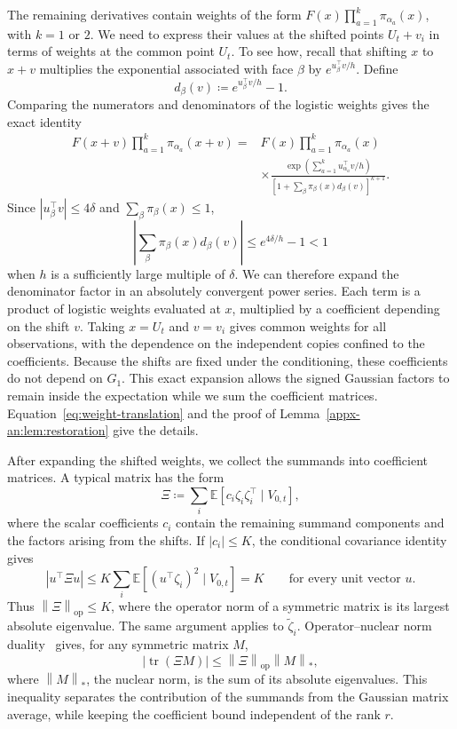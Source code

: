 \documentclass[11pt,letterpaper]{article}
\theoremstyle{remark}
\newcommand{\E}{\mathbb E}
\newcommand{\tr}{\operatorname{tr}}
\newcommand{\op}{\mathrm{op}}
\newcommand{\norm}[1]{\left\lVert#1\right\rVert}
\begin{document}
The remaining derivatives contain weights of the form
\(F(x)\prod_{a=1}^k\pi_{\alpha_a}(x)\), with \(k=1\) or \(2\).
We need to express their values at the shifted points \(U_t+v_i\)
in terms of weights at the common point \(U_t\). To see how, recall
that shifting \(x\) to \(x+v\) multiplies the exponential associated
with face \(\beta\) by \(e^{u_\beta^\top v/h}\). Define
\[
 d_\beta(v)\coloneqq e^{u_\beta^\top v/h}-1.
\]
Comparing the numerators and denominators of the logistic weights
gives the exact identity
\[
 \begin{aligned}
 F(x+v)\prod_{a=1}^k\pi_{\alpha_a}(x+v)
 ={}&F(x)\prod_{a=1}^k\pi_{\alpha_a}(x)\\
 &\times\frac{
   \exp\!\left(\sum_{a=1}^k u_{\alpha_a}^\top v/h\right)}{
   \left[1+\sum_\beta\pi_\beta(x)d_\beta(v)\right]^{k+1}}.
 \end{aligned}
\]
Since \(|u_\beta^\top v|\le4\delta\) and
\(\sum_\beta\pi_\beta(x)\le1\),
\[
 \left|\sum_\beta\pi_\beta(x)d_\beta(v)\right|
 \le e^{4\delta/h}-1<1
\]
when \(h\) is a sufficiently large multiple of \(\delta\). We can
therefore expand the denominator factor in an absolutely convergent
power series. Each term is a product of logistic weights evaluated
at \(x\), multiplied by a coefficient depending on the shift \(v\).
Taking \(x=U_t\) and \(v=v_i\) gives common weights for all
observations, with the dependence on the independent copies confined
to the coefficients. Because the shifts are fixed under the
conditioning, these coefficients do not depend on \(G_1\). This exact
expansion allows the signed Gaussian factors to remain inside the
expectation while we sum the coefficient matrices.
Equation~\eqref{eq:weight-translation} and the proof of
Lemma~\ref{appx-an:lem:restoration} give the details.

After expanding the shifted weights, we collect the summands into
coefficient matrices. A typical matrix has the form
\[
 \Xi\coloneqq\sum_i\E[c_i\zeta_i\zeta_i^\top\mid V_{0,t}],
\]
where the scalar coefficients \(c_i\) contain the remaining summand
components and the factors arising from the shifts. If \(|c_i|\le K\),
the conditional covariance identity gives
\[
 |u^\top\Xi u|
 \le K\sum_i\E[(u^\top\zeta_i)^2\mid V_{0,t}]
 =K
 \qquad\text{for every unit vector }u.
\]
Thus \(\norm\Xi_\op\le K\), where the operator norm of a symmetric
matrix is its largest absolute eigenvalue. The same argument applies
to \(\widetilde\zeta_i\). Operator--nuclear norm
duality~\cite[Chapter~IV]{Bhatia1997} gives, for any symmetric matrix \(M\),
\[
 |\tr(\Xi M)|\le\norm\Xi_\op\norm M_*,
\]
where \(\norm M_*\), the nuclear norm, is the sum of its absolute
eigenvalues. This inequality separates the contribution of the
summands from the Gaussian matrix average, while keeping the
coefficient bound independent of the rank \(r\).
\end{document}

